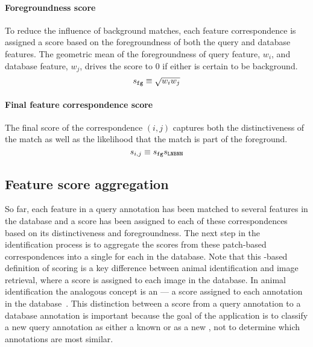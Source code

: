         \paragraph{Foregroundness score}
            To reduce the influence of background matches, each feature correspondence is assigned a score based
              on the foregroundness of both the query and database features.
            The geometric mean of the foregroundness of query feature, $w_i$, and database feature, $w_j$, drives
              the score to $0$ if either is certain to be background.
            \begin{equation}
                s_{{\tt fg}} \equiv \sqrt{w_i w_j}
            \end{equation}

        \paragraph{Final feature correspondence score}
            The final score of the correspondence $(i, j)$ captures both the distinctiveness of the match as well
              as the likelihood that the match is part of the foreground.
              \begin{equation}\label{eqn:featscore}
                  s_{i,j} \equiv s_{{\tt fg}} s_{\tt{LNBNN}} 
              \end{equation}

    \subsection{Feature score aggregation}\label{subsec:namescore}

        So far, each feature in a query annotation has been matched to several features in the database and a
          score has been assigned to each of these correspondences based on its distinctiveness and foregroundness.
        The next step in the identification process is to aggregate the scores from these patch-based
          correspondences into a single \glossterm{\namescore} for each \name{} in the database.
        Note that this \name-based definition of scoring is a key difference between animal identification and
          image retrieval, where a score is assigned to each image in the database.
        In animal identification the analogous concept is an \glossterm{\annotscore} --- a score assigned to each
          annotation in the database~\cite{philbin_object_2007}.
        This distinction between a score from a query annotation to a database annotation is important because
          the goal of the application is to classify a new query annotation as either a known \name{} or as a new
          \name{}, not to determine which annotations are most similar.

